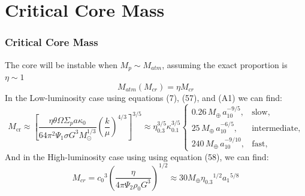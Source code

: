 \documentclass{beamer}
\begin{document}
\section{Critical Core Mass}
\begin{frame}
\frametitle{Critical Core Mass}
The core will be instable when $M_p \sim M_{atm}$, assuming the exact proportion is $\eta \sim 1$
\begin{equation}
\tag{59}
M_{atm}(M_{cr})=\eta M_{cr}
\end{equation}
In the Low-luminosity case using equations (7), (57), and (A1) we can find:
\begin{equation}
\tag{60}
M_{\text{cr}} \approx \left[ \frac{\eta \theta \Omega \Sigma_p a \kappa_0}{64 \pi^2 \Psi_1 \sigma G^3 M_\odot^{1/3}} \left( \frac{k}{\mu} \right)^{4/3} \right]^{3/5}
\approx \eta_{0.3}^{3/5} \kappa_{0.1}^{3/5} 
\begin{cases} 
0.26 \, M_\oplus \, a_{10}^{-9/5}, & \text{slow}, \\
25 \, M_\oplus \, a_{10}^{-6/5}, & \text{intermediate}, \\
240 \, M_\oplus \, a_{10}^{-9/10}, & \text{fast},
\end{cases}
\end{equation}
And in the High-luminosity case using using equation (58), we can find:
\begin{equation}
\tag{61}
M_{cr} = {c_0}^3{(\frac{\eta}{4 \pi \Psi_2 \rho_0 G^3})}^{1/2} \approx 30 M_{\oplus} {\eta_{0.3}}^{1/2} {a_1}^{5/8} 
\end{equation}
\end{frame}
\end{document}
